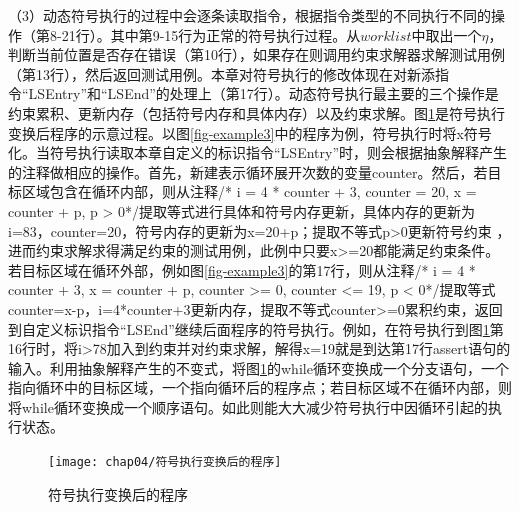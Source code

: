 （3）动态符号执行的过程中会逐条读取指令，根据指令类型的不同执行不同的操作（第8-21行）。其中第9-15行为正常的符号执行过程。从$worklist$中取出一个$\eta$，判断当前位置是否存在错误（第10行），如果存在则调用约束求解器求解测试用例（第13行），然后返回测试用例。本章对符号执行的修改体现在对新添指令“LSEntry”和“LSEnd”的处理上（第17行）。动态符号执行最主要的三个操作是约束累积、更新内存（包括符号内存和具体内存）以及约束求解。图\ref{符号执行变换后的程序}是符号执行变换后程序的示意过程。以图\ref{fig-example3}中的程序为例，符号执行时将x符号化。当符号执行读取本章自定义的标识指令“LSEntry”时，则会根据抽象解释产生的注释做相应的操作。首先，新建表示循环展开次数的变量counter。然后，若目标区域包含在循环内部，则从注释/* i = 4 * counter + 3, counter = 20, x = counter + p, p > 0*/提取等式进行具体和符号内存更新，具体内存的更新为i=83，counter=20，符号内存的更新为x=20+p；提取不等式p>0更新符号约束
，进而约束求解求得满足约束的测试用例，此例中只要x>=20都能满足约束条件。若目标区域在循环外部，例如图\ref{fig-example3}的第17行，则从注释/* i = 4 * counter + 3, x = counter + p, counter >= 0, 
   counter <= 19, p < 0*/提取等式counter=x-p，i=4*counter+3更新内存，提取不等式counter>=0累积约束，返回到自定义标识指令“LSEnd”继续后面程序的符号执行。例如，在符号执行到图\ref{符号执行变换后的程序}第16行时，将i>78加入到约束并对约束求解，解得x=19就是到达第17行assert语句的输入。利用抽象解释产生的不变式，将图\ref{符号执行变换后的程序}的while循环变换成一个分支语句，一个指向循环中的目标区域，一个指向循环后的程序点；若目标区域不在循环内部，则将while循环变换成一个顺序语句。如此则能大大减少符号执行中因循环引起的执行状态。

\begin{figure}[htb]
\begin{center}
\texttt{[image: chap04/符号执行变换后的程序]}
\end{center}
\caption{符号执行变换后的程序}
\label{符号执行变换后的程序}
\end{figure}


